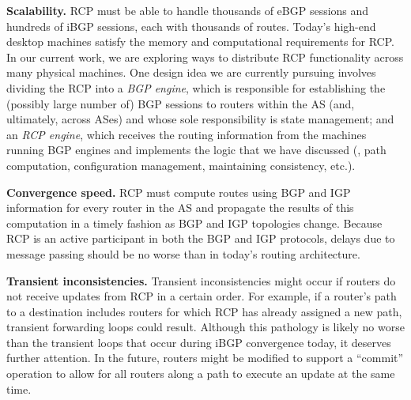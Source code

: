 


 {\bf Scalability.} RCP must be able to handle thousands of eBGP
  sessions and hundreds of iBGP sessions, each with thousands of routes.
  Today's high-end desktop machines satisfy the memory and computational
  requirements for RCP.  In our current work, we are exploring ways to
  distribute RCP functionality across many physical machines.  One
  design idea we are currently pursuing involves dividing the RCP into a
  {\em BGP engine}, which is responsible for establishing the (possibly
  large number of) BGP sessions to routers within the AS (and,
  ultimately, across ASes) and whose sole responsibility is state
  management; and an {\em RCP engine}, which receives the routing
  information from the machines running BGP engines and implements the
  logic that we have discussed (\eg, path computation,
  configuration management, maintaining consistency, etc.).  
  

 {\bf Convergence speed.} RCP must compute routes using BGP and
  IGP information for every router in the AS and propagate the results
  of this computation in a timely fashion as BGP and IGP topologies
  change.  Because RCP is an active participant in both the BGP and
  IGP protocols, delays due to message passing should be no worse than
  in today's routing architecture.

 {\bf Transient inconsistencies.}  Transient inconsistencies might occur
  if routers do not receive updates from RCP in a certain order. For
  example, if a router's path to a destination includes routers for
  which RCP has already assigned a new path, transient forwarding
  loops could result.  Although this pathology is likely no worse than the
  transient loops that occur during iBGP convergence today, it deserves
  further attention.  In the future, routers might be modified to
  support a ``commit'' operation to allow for all routers along a path
  to execute an update at the same time.


